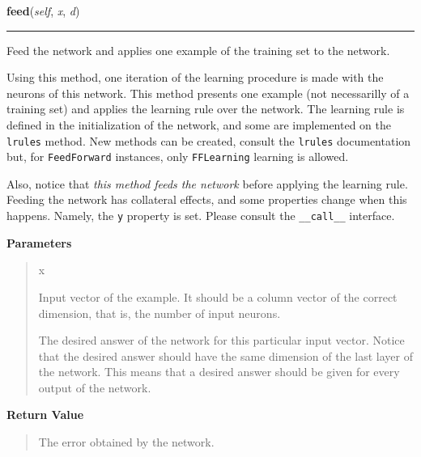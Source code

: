     \label{peach:nn:nn:FeedForward:feed}

    \vspace{0.5ex}

    \begin{boxedminipage}{\textwidth}

    \raggedright \textbf{feed}(\textit{self}, \textit{x}, \textit{d})

    \vspace{-1.5ex}

    \rule{\textwidth}{0.5\fboxrule}

Feed the network and applies one example of the training set to the
network.

Using this method, one iteration of the learning procedure is made with
the neurons of this network. This method presents one example (not
necessarilly of a training set) and applies the learning rule over the
network. The learning rule is defined in the initialization of the
network, and some are implemented on the \texttt{lrules} method. New methods
can be created, consult the \texttt{lrules} documentation but, for
\texttt{FeedForward} instances, only \texttt{FFLearning} learning is allowed.

Also, notice that \emph{this method feeds the network} before applying the
learning rule. Feeding the network has collateral effects, and some
properties change when this happens. Namely, the \texttt{y} property is set.
Please consult the \texttt{{\_}{\_}call{\_}{\_}} interface.
    \vspace{1ex}

      \textbf{Parameters}
      \begin{quote}
        \begin{Ventry}{x}

          \item[x]


Input vector of the example. It should be a column vector of the
correct dimension, that is, the number of input neurons.
          \item[d]


The desired answer of the network for this particular input vector.
Notice that the desired answer should have the same dimension of the
last layer of the network. This means that a desired answer should
be given for every output of the network.
        \end{Ventry}

      \end{quote}

    \vspace{1ex}

      \textbf{Return Value}
      \begin{quote}

The error obtained by the network.
      \end{quote}

    \vspace{1ex}

    \end{boxedminipage}

